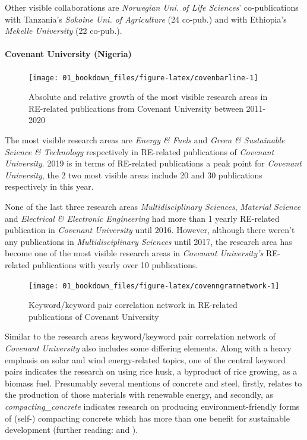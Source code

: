 \documentclass[
]{book}
\begin{document}
Other visible collaborations are \emph{Norwegian Uni. of Life Sciences}' co-publications with Tanzania's \emph{Sokoine Uni. of Agriculture} (24 co-pub.) and with Ethiopia's \emph{Mekelle University} (22 co-pub.).

\hypertarget{covenant-university-nigeria}{%
\paragraph{Covenant University (Nigeria)}\label{covenant-university-nigeria}}

\begin{figure}
\texttt{[image: 01\_bookdown\_files/figure-latex/covenbarline-1]} \caption{Absolute and relative growth of the most visible research areas in RE-related publications from Covenant University between 2011-2020}\label{fig:covenbarline}
\end{figure}

The most visible research areas are \emph{Energy \& Fuels} and \emph{Green \& Sustainable Science \& Technology} respectively in RE-related publications of \emph{Covenant University}. 2019 is in terms of RE-related publications a peak point for \emph{Covenant University}, the 2 two most visible areas include 20 and 30 publications respectively in this year.

None of the last three research areas \emph{Multidisciplinary Sciences}, \emph{Material Science} and \emph{Electrical \& Electronic Engineering} had more than 1 yearly RE-related publication in \emph{Covenant University} until 2016. However, although there weren't any publications in \emph{Multidisciplinary Sciences} until 2017, the research area has become one of the most visible research areas in \emph{Covenant University's} RE-related publications with yearly over 10 publications.

\begin{figure}
\texttt{[image: 01\_bookdown\_files/figure-latex/covenngramnetwork-1]} \caption{Keyword/keyword pair correlation network in RE-related publications of Covenant University}\label{fig:covenngramnetwork}
\end{figure}

Similar to the research areas keyword/keyword pair correlation network of \emph{Covenant University} also includes some differing elements. Along with a heavy emphasis on solar and wind energy-related topics, one of the central keyword pairs indicates the research on using rice husk, a byproduct of rice growing, as a biomass fuel. Presumably several mentions of concrete and steel, firstly, relates to the production of those materials with renewable energy, and secondly, as \emph{compacting\_concrete} indicates research on producing environment-friendly forms of (self-) compacting concrete which has more than one benefit for sustainable development (further reading: \citet{long2015} and \citet{gupta2021}).
\end{document}
